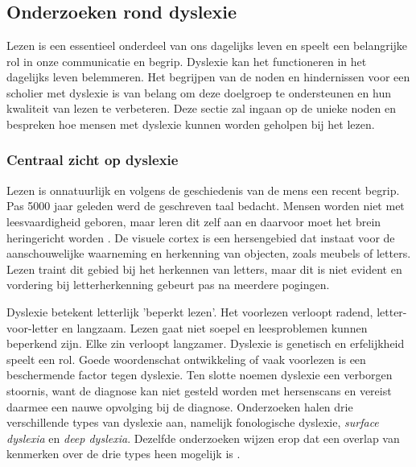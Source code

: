 \chapter{}%
\label{ch:stand-van-zaken}


\section{Onderzoeken rond dyslexie}

Lezen is een essentieel onderdeel van ons dagelijks leven en speelt een belangrijke rol in onze communicatie en begrip. Dyslexie kan het functioneren in het dagelijks leven belemmeren. Het begrijpen van de noden en hindernissen voor een scholier met dyslexie is van belang om deze doelgroep te ondersteunen en hun kwaliteit van lezen te verbeteren. Deze sectie zal ingaan op de unieke noden en bespreken hoe mensen met dyslexie kunnen worden geholpen bij het lezen.

\subsection{Centraal zicht op dyslexie}

Lezen is onnatuurlijk en volgens de geschiedenis van de mens een recent begrip. Pas 5000 jaar geleden werd de geschreven taal bedacht. Mensen worden niet met leesvaardigheid geboren, maar leren dit zelf aan en daarvoor moet het brein heringericht worden \autocite{Bonte2020, VanDerMeer2022}. De visuele cortex is een hersengebied dat instaat voor de aanschouwelijke waarneming en herkenning van objecten, zoals meubels of letters. Lezen traint dit gebied bij het herkennen van letters, maar dit is niet evident en vordering bij letterherkenning gebeurt pas na meerdere pogingen. 

 
Dyslexie betekent letterlijk 'beperkt lezen'. Het voorlezen verloopt radend, letter-voor-letter en langzaam. Lezen gaat niet soepel en leesproblemen kunnen beperkend zijn. Elke zin verloopt langzamer. Dyslexie is genetisch en erfelijkheid speelt een rol. Goede woordenschat ontwikkeling of vaak voorlezen is een beschermende factor tegen dyslexie. Ten slotte noemen \textcite{Vellutino2004, Bonte2020} dyslexie een verborgen stoornis, want de diagnose kan niet gesteld worden met hersenscans en vereist daarmee een nauwe opvolging bij de diagnose. Onderzoeken halen drie verschillende types van dyslexie aan, namelijk fonologische dyslexie, \textit{surface dyslexia} en \textit{deep dyslexia}. Dezelfde onderzoeken wijzen erop dat een overlap van kenmerken over de drie types heen mogelijk is \autocite{Rello2012, Vellutino2004}.

